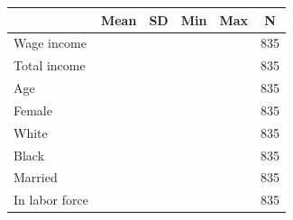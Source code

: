 {
\def\sym#1{\ifmmode^{#1}\else\(^{#1}\)\fi}
\begin{tabular}{l*{1}{ccccc}}
\toprule
                    &        Mean&          SD&         Min&         Max&           N\\
\midrule
Wage income         &            &            &            &            &         835\\
Total income        &            &            &            &            &         835\\
Age                 &            &            &            &            &         835\\
Female              &            &            &            &            &         835\\
White               &            &            &            &            &         835\\
Black               &            &            &            &            &         835\\
Married             &            &            &            &            &         835\\
In labor force      &            &            &            &            &         835\\
\bottomrule
\end{tabular}
}
